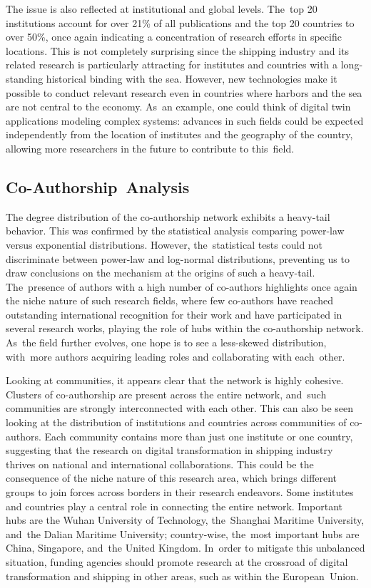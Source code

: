 \documentclass[jmse,review,accept,pdftex,moreauthors]{Definitions/mdpi}
\begin{document}
The issue is also reflected at institutional and global levels. The~top 20 institutions account for over 21\% of all publications and the top 20 countries to over 50\%, once again indicating a concentration of research efforts in specific locations. This is not completely surprising since the shipping industry and its related research is particularly attracting for institutes and countries with a long-standing historical binding with the sea. However, new technologies make it possible to conduct relevant research even in countries where harbors and the sea are not central to the economy. As~an example, one could think of digital twin applications modeling complex systems: advances in such fields could be expected independently from the location of institutes and the geography of the country, allowing more researchers in the future to contribute to this~field.

\subsection{Co-Authorship~Analysis}
The degree distribution of the co-authorship network exhibits a heavy-tail behavior. This was confirmed by the statistical analysis comparing power-law versus exponential distributions. However, the~statistical tests could not discriminate between power-law and log-normal distributions, preventing us to draw conclusions on the mechanism at the origins of such a heavy-tail. The~presence of authors with a high number of co-authors highlights once again the niche nature of such research fields, where few co-authors have reached outstanding international recognition for their work and have participated in several research works, playing the role of hubs within the co-authorship network. As~the field further evolves, one hope is to see a less-skewed distribution, with~more authors acquiring leading roles and collaborating with each~other.

Looking at communities, it appears clear that the network is highly cohesive. Clusters of co-authorship are present across the entire network, and~such communities are strongly interconnected with each other. This can also be seen looking at the distribution of institutions and countries across communities of co-authors. Each community contains more than just one institute or one country, suggesting that the research on digital transformation in shipping industry thrives on national and international collaborations. This could be the consequence of the niche nature of this research area, which brings different groups to join forces across borders in their research endeavors. Some institutes and countries play a central role in connecting the entire network. Important hubs are the Wuhan University of Technology, the~Shanghai Maritime University, and~the Dalian Maritime University; country-wise, the~most important hubs are China, Singapore, and~the United Kingdom. In~order to mitigate this unbalanced situation, funding agencies should promote research at the crossroad of digital transformation and shipping in other areas, such as within the European~Union.
\end{document}
